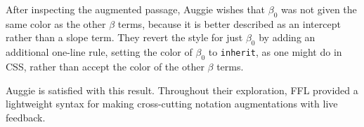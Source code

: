 After inspecting the augmented passage, Auggie wishes that $\beta_0$ was not given the same color as the other $\beta$ terms, because it is better described as an intercept rather than a slope term. They revert the style for just $\beta_0$ by adding an additional one-line rule, setting the color of $\beta_0$ to \texttt{inherit}, as one might do in CSS, rather than accept the color of the other $\beta$ terms.\\[1ex]

Auggie is satisfied with this result. Throughout their exploration, FFL provided a lightweight syntax for making cross-cutting notation augmentations with live feedback.

